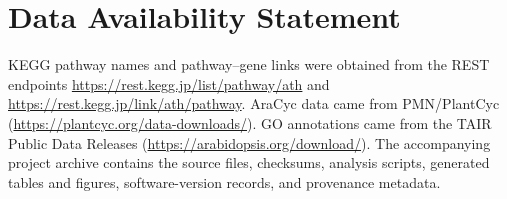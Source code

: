 \documentclass[12pt,letterpaper,oneside,openany]{book}
\begin{document}
\chapter*{Data Availability Statement}
KEGG pathway names and pathway--gene links were obtained from the REST endpoints
\url{https://rest.kegg.jp/list/pathway/ath} and
\url{https://rest.kegg.jp/link/ath/pathway}. AraCyc data came from PMN/PlantCyc
(\url{https://plantcyc.org/data-downloads/}). GO annotations came from the TAIR
Public Data Releases (\url{https://arabidopsis.org/download/}). The accompanying
project archive contains the source files, checksums, analysis scripts, generated
tables and figures, software-version records, and provenance metadata.

\begin{singlespace}


\end{singlespace}
\end{document}
